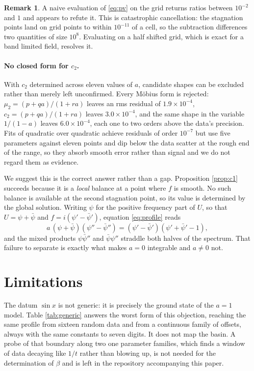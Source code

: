 \documentclass[11pt]{article}
\theoremstyle{definition}
\newtheorem{remark}[proposition]{Remark}
\begin{document}
\begin{remark}
A naive evaluation of \eqref{eq:pv} on the grid returns ratios between
$10^{-2}$ and $1$ and appears to refute it. This is catastrophic cancellation:
the stagnation points land on grid points to within $10^{-11}$ of a cell, so
the subtraction differences two quantities of size $10^{8}$. Evaluating on a
half shifted grid, which is exact for a band limited field, resolves it.
\end{remark}

\paragraph{No closed form for $c_2$.} With $c_2$ determined across eleven values
of $a$, candidate shapes can be excluded rather than merely left unconfirmed.
Every M\"{o}bius form is rejected: $\mu_2 = (p+qa)/(1+ra)$ leaves an rms
residual of $1.9\times10^{-4}$, $c_2 = (p+qa)/(1+ra)$ leaves
$3.0\times10^{-4}$, and the same shape in the variable $1/(1-a)$ leaves
$6.0\times10^{-4}$, each one to two orders above the data's precision. Fits of
quadratic over quadratic achieve residuals of order $10^{-7}$ but use five
parameters against eleven points and dip below the data scatter at the rough
end of the range, so they absorb smooth error rather than signal and we do not
regard them as evidence.

We suggest this is the correct answer rather than a gap. Proposition
\ref{prop:c1} succeeds because it is a \emph{local} balance at a point where
$f$ is smooth. No such balance is available at the second stagnation point, so
its value is determined by the global solution. Writing $\psi$ for the positive
frequency part of $U$, so that $U = \psi+\bar\psi$ and
$f = i(\psi'-\bar\psi')$, equation \eqref{eq:profile} reads
\begin{equation}
  a\,(\psi+\bar\psi)(\psi''-\bar\psi'')
  = (\psi'-\bar\psi')(\psi'+\bar\psi'-1),
\end{equation}
and the mixed products $\psi\bar\psi''$ and $\bar\psi\psi''$ straddle both
halves of the spectrum. That failure to separate is exactly what makes $a=0$
integrable and $a\ne 0$ not.

\section{Limitations}
\label{sec:caveats}

The datum $\sin x$ is not generic: it is precisely the ground state of the
$a=1$ model. Table \ref{tab:generic} answers the worst form of this objection,
reaching the same profile from sixteen random data and from a continuous family
of offsets, always with the same constants to seven digits. It does not map the
basin. A probe of that boundary along two one parameter families, which finds a
window of data decaying like $1/t$ rather than blowing up, is not needed for
the determination of $\beta$ and is left in the repository accompanying this
paper.
\end{document}
